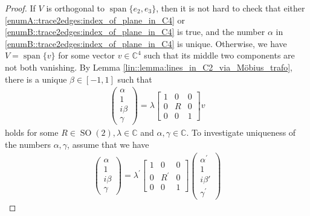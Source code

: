 \documentclass{amsart}
\newcommand{\C}{\mathbb{C}}
\DeclareMathOperator{\SO}{SO}
\DeclareMathOperator{\spann}{span}
\begin{document}
\begin{proof}
    If $V$ is orthogonal to $\spann\{e_2, e_3\}$, then it is not hard to check that either \ref{enumA::trace2edges:index_of_plane_in_C4} or \ref{enumB::trace2edges:index_of_plane_in_C4} is true, and the number $\alpha$ in \ref{enumB::trace2edges:index_of_plane_in_C4} is unique. Otherwise, we have $V = \spann \{v\}$ for some vector $v \in \C^4$ such that its middle two components are not both vanishing. By Lemma \ref{lin::lemma:lines_in_C2_via_Möbius_trafo}, there is a unique $\beta \in [-1, 1]$ such that
    \begin{align}
    \label{ntg::eq:canonical_vector_with_alpha_beta_gamma_for_one_edge}
        \begin{pmatrix}
            \alpha \\ 1 \\ i \beta \\ \gamma
        \end{pmatrix}
        =
        \lambda \left[\begin{array}{c|c|c}
            1 & 0 & 0\\
            \hline
            0 & R & 0 \\
            \hline
            0 & 0 & 1
        \end{array}\right]
        v
    \end{align}
    holds for some $R \in \SO(2), \lambda \in \C$ and $\alpha, \gamma \in \C$. To investigate uniqueness of the numbers $\alpha, \gamma$, assume that we have
    \begin{align} 
    \label{ntg::eq:uniqueness_of_alpha_gamma}
        \begin{pmatrix}
            \alpha \\ 1 \\ i \beta \\ \gamma
        \end{pmatrix}
        = \lambda^\prime \left[\begin{array}{c|c|c}
            1 & 0 & 0\\
            \hline
            0 & R^\prime & 0 \\
            \hline
            0 & 0 & 1
            \end{array}\right] \begin{pmatrix}
                \alpha^\prime \\ 1 \\ i \beta' \\ \gamma^\prime
            \end{pmatrix}

\end{align}
\end{proof}
\end{document}
